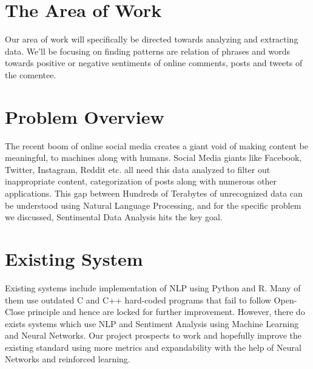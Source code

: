 \section{The Area of Work}
Our area of work will specifically be directed towards analyzing and extracting data. We'll be focusing on finding patterns are relation of phrases and words towards positive or negative sentiments of online comments, posts and tweets of the comentee.
 


\section{Problem Overview}
The recent boom of online social media creates a giant void of making content be meaningful, to machines along with humans. Social Media giants like Facebook, Twitter, Instagram, Reddit etc. all need this data analyzed to filter out inappropriate content, categorization of posts along with numerous other applications. 
This gap between Hundreds of Terabytes of unrecognized data can be understood using Natural Language Processing, and for the specific problem we discussed, Sentimental Data Analysis hits the key goal.

\section{Existing System}
Existing systems include implementation of NLP using Python and R. Many of them use outdated C and C++ hard-coded programs that fail to follow Open-Close principle and hence are locked for further improvement.
However, there do exists systems which use NLP and Sentiment Analysis using Machine Learning and Neural Networks. Our project prospects to work and hopefully improve the existing standard using more metrics and expandability with the help of Neural Networks and reinforced learning.




